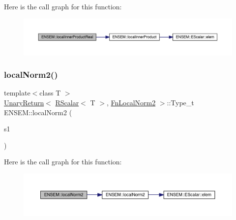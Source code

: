 Here is the call graph for this function\+:\nopagebreak
\begin{figure}[H]
\begin{center}
\leavevmode
\includegraphics[width=350pt]{d9/ded/group__rscalar_gafd6d5a4377919b182f234ffe0eea09b4_cgraph}
\end{center}
\end{figure}
\mbox{\label{group__rscalar_ga3ca325ab0808bb3c4b966320b923c213}} 
\subsubsection{\texorpdfstring{localNorm2()}{localNorm2()}}
{\footnotesize\ttfamily template$<$class T $>$ \\
\mbox{\hyperlink{structENSEM_1_1UnaryReturn}{Unary\+Return}}$<$ \mbox{\hyperlink{classENSEM_1_1RScalar}{R\+Scalar}}$<$ T $>$, \mbox{\hyperlink{structENSEM_1_1FnLocalNorm2}{Fn\+Local\+Norm2}} $>$\+::Type\+\_\+t E\+N\+S\+E\+M\+::local\+Norm2 (\begin{DoxyParamCaption}\item[{const \mbox{\hyperlink{classENSEM_1_1RScalar}{R\+Scalar}}$<$ T $>$ \&}]{s1 }\end{DoxyParamCaption})\hspace{0.3cm}{\ttfamily [inline]}}

Here is the call graph for this function\+:\nopagebreak
\begin{figure}[H]
\begin{center}
\leavevmode
\includegraphics[width=350pt]{d9/ded/group__rscalar_ga3ca325ab0808bb3c4b966320b923c213_cgraph}
\end{center}
\end{figure}
\mbox{\label{group__rscalar_gacf4bc45f226554e38012a20a649605ed}} 
